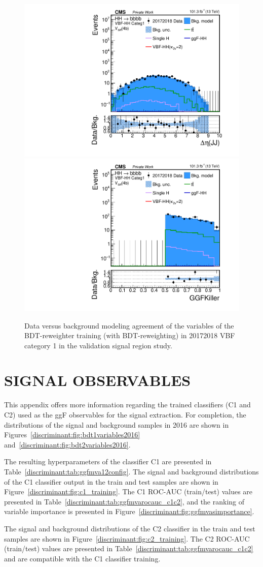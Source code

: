 \begin{figure}[htbp!]
\begin{center}
\includegraphics[width=0.24\linewidth]{Figures/Modeling/background/plotsDatadrivenWithBDT/20172018/VBFcateg1_SR_210/Histogram/plot20172018_j1j2_deltaEta_Btag4_VBFcateg1_SR_210_Histogram_log.pdf}
\includegraphics[width=0.24\linewidth]{Figures/Modeling/background/plotsDatadrivenWithBDT/20172018/VBFcateg1_SR_210/Histogram/plot20172018_GGFKiller_Btag4_VBFcateg1_SR_210_Histogram_log.pdf}
\end{center}
\caption{Data versus background modeling agreement of the variables of the BDT-reweighter training (with BDT-reweighting) in 20172018 VBF category 1 in the validation signal region study.}
\label{bkg:fig:valsrbdtregvarvbf1_20172018}
\end{figure}

\chapter{SIGNAL OBSERVABLES} 
\label{appendix:signalobs}
This appendix offers more information regarding the trained classifiers (C1 and C2) used as the ggF observables for the signal extraction. For completion, the distributions of the signal and background samples in 2016 are shown in Figures~\ref{discriminant:fig:bdt1variables2016} and~\ref{discriminant:fig:bdt2variables2016}.

The resulting hyperparameters of the classifier C1 are presented in Table~\ref{discriminant:tab:ggfmva12config}. The signal and background distributions of the C1 classifier output in the train and test samples are shown in Figure~\ref{discriminant:fig:c1_training}. The C1 ROC-AUC (train/test) values are presented in Table~\ref{discriminant:tab:ggfmvarocauc_c1c2}, and the ranking of variable importance is presented in Figure~\ref{discriminant:fig:ggfmvasimportance}. 

The signal and background distributions of the C2 classifier in the train and test samples are shown in Figure~\ref{discriminant:fig:c2_training}. The C2 ROC-AUC (train/test) values are presented in Table~\ref{discriminant:tab:ggfmvarocauc_c1c2} and are compatible with the C1 classifier training.


